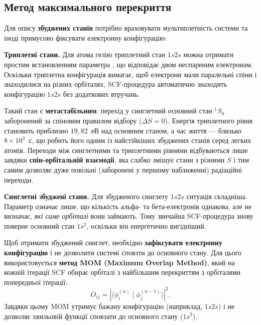 \subsection*{Метод максимального перекриття}

Для опису \textbf{збуджених станів} потрібно враховувати мультиплетність системи
та іноді примусово фіксувати електронну конфігурацію:

\textbf{Триплетні стани.} Для атома гелію триплетний стан $1s2s$
можна отримати простим встановленням параметра , що відповідає
двом неспареним електронам. Оскільки триплетна конфігурація вимагає, щоб електрони
мали паралельні спіни і знаходилися на різних орбіталях, SCF-процедура автоматично
знаходить конфігурацію $1s2s$ без додаткових втручань.

\begin{commentbox}
    Такий стан  є \textbf{метастабільним}: перехід у синглетний
    основний стан ${}^1S_0$ заборонений за спіновим правилом відбору ($\Delta S = 0$).
    Енергія триплетного рівня становить приблизно $19{,}82$~еВ над основним станом,
    а час життя --- близько $8 \times 10^3$~с, що робить його одним із найстійкіших
    збуджених станів серед легких атомів. Переходи між синглетними та триплетними рівнями відбуваються лише завдяки
    \textbf{спін-орбітальній взаємодії}, яка слабко змішує стани з різними $S$ і тим самим
    дозволяє дуже повільні (заборонені у першому наближенні) радіаційні переходи.
\end{commentbox}

\textbf{Синглетні збуджені стани.} Для збудженого синглету $1s2s$ ситуація складніша.
Параметр  означає лише, що кількість альфа- та бета-електронів
однакова, але не визначає, \emph{які саме орбіталі} вони займають. Тому звичайна
SCF-процедура знову поверне основний стан $1s^2$, оскільки він енергетично вигідніший.

Щоб отримати збуджений синглет, необхідно \textbf{зафіксувати електронну конфігурацію}
і не дозволити системі сповзти до основного стану. Для цього використовується
\textbf{метод MOM (Maximum Overlap Method)}, який на кожній ітерації SCF обирає орбіталі
з найбільшим перекриттям з орбіталями попередньої ітерації:
\[
    O_{ij} = \left| \langle \phi_i^{(n)} \mid \phi_j^{(n-1)} \rangle \right|^2.
\]
Завдяки цьому MOM утримує бажану конфігурацію (наприклад, $1s2s$) і не дозволяє
хвильовій функції сповзати до основного стану ($1s^2$).

